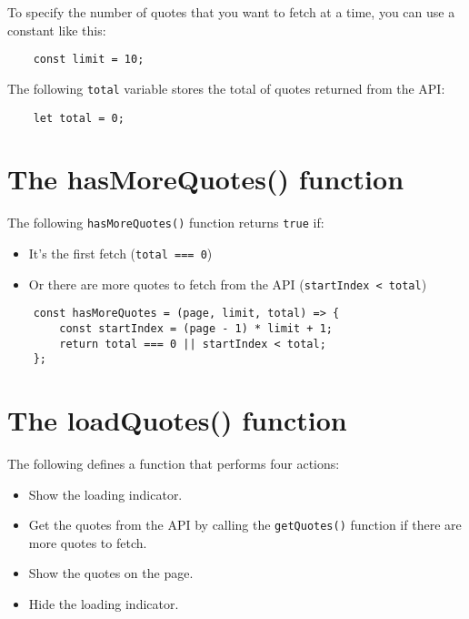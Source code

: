 \documentclass[11pt]{article}
\begin{document}
\noindent
To specify the number of quotes that you want to fetch at a time,
you can use a constant like this:

\begin{lstlisting}
    const limit = 10;
\end{lstlisting}

\noindent
The following \verb|total| variable stores the total of quotes
returned from the API:

\begin{lstlisting}
    let total = 0;
\end{lstlisting}

\section*{The hasMoreQuotes() function}

The following \verb|hasMoreQuotes()| function returns \verb|true| if:

\begin{itemize}
\item It's the first fetch (\verb|total === 0|)
\item Or there are more quotes to fetch from the API (\verb|startIndex < total|)
\end{itemize}

\begin{lstlisting}
    const hasMoreQuotes = (page, limit, total) => {
        const startIndex = (page - 1) * limit + 1;
        return total === 0 || startIndex < total;
    };
\end{lstlisting}

\section*{The loadQuotes() function}

The following defines a function that performs four actions:

\begin{itemize}
\item Show the loading indicator.
\item Get the quotes from the API by calling the \verb|getQuotes()| function
if there are more quotes to fetch.
\item Show the quotes on the page.
\item Hide the loading indicator.
\end{itemize}
\end{document}
